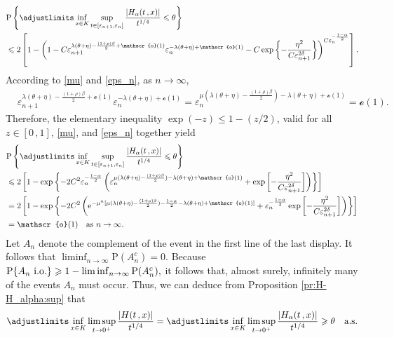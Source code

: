 \documentclass[reqno]{amsart}
\newcommand{\<}{\langle}
\renewcommand{\>}{\rangle}
\renewcommand{\P}{\mathrm{P}}
\newcommand{\1}{\mathbb{1}}
\newcommand{\e}{{\rm e}}
\renewcommand{\ge}{\geqslant}
\renewcommand{\le}{\leqslant}
\theoremstyle{definition}
\numberwithin{equation}{section}
\begin{document}
\begin{align*}
	&\P\left\{\adjustlimits
		\inf_{x \in K} \sup_{t \in [\varepsilon_{n+1},\varepsilon_n]}
		\frac{|H_\alpha(t\,,x)|}{t^{1/4}} \le \theta \right\}\\
	& \le 2 \left[ 1 - \left( 1 - C 
		\varepsilon_{n+1}^{\lambda(\theta+\eta)-\frac{(1+\rho)\beta}{2} 
		+ \mathscr{o}(1)} \varepsilon_n^{-\lambda(\theta+\eta) + \mathscr{o}(1)}
	- C\exp\left\{- \frac{\eta^2 }{C\varepsilon_{n+1}^{2\delta}}\right\}
		\right)^{C \varepsilon_n^{-\frac{1-\alpha}{2}}} \right].
\end{align*}
According to \eqref{mu} and \eqref{eps_n}, as $n\to\infty$,
\begin{align*}
	&\varepsilon_{n+1}^{\lambda(\theta+\eta)-\frac{(1+\rho)\beta}{2} 
		+ \mathscr{o}(1)} \varepsilon_n^{-\lambda(\theta+\eta) + \mathscr{o}(1)}
		= \varepsilon_n^{\mu(\lambda(\theta+\eta)-\frac{(1+\rho)\beta}{2})
		-\lambda(\theta+\eta) + \mathscr{o}(1)} = \mathscr{o}(1).
\end{align*}
Therefore, the elementary inequality $\exp(-z) \le 1-(z/2)$,
valid for all $z \in [0\,,1]$, \eqref{mu}, and \eqref{eps_n} together yield
\begin{align*}
	&\P\left\{ \adjustlimits
		\inf_{x \in K} \sup_{t \in [\varepsilon_{n+1},\varepsilon_n]}
		\frac{|H_\alpha(t\,,x)|}{t^{1/4}} \le \theta \right\}\\
	&\le2\left[ 1 - \exp\left\{ -2C^2 \varepsilon_n^{-\frac{1-\alpha}{2}}
		\left(\varepsilon_{n}^{\mu(\lambda(\theta+\eta)-
		\frac{(1+\rho)\beta}{2})-\lambda(\theta+\eta)
		+\mathscr{o}(1)} + \exp\left[-\frac{\eta^2}{C\varepsilon_{n+1}^{2\delta}}\right]
		\right)\right\} \right]\\
	&= 2\left[ 1 - \exp\left\{ -2C^2 \left(\e^{ - \mu^n 
		[ \mu ( \lambda(\theta+\eta) - \frac{(1+\rho)\beta}{2} ) -\frac{1-\alpha}{2} - 
		\lambda(\theta+\eta) + \mathscr{o}(1) ]} + 
		\varepsilon_n^{-\frac{1-\alpha}{2}} 
		\exp\left[-\frac{\eta^2}{C\varepsilon_{n+1}^{2\delta}}\right]
		\right)\right\} \right]\\
	&=\mathscr{o}(1) \quad \text{as $n\to\infty$.}
\end{align*}
Let $A_n$ denote the complement of the event in the first line of the last display.
It follows that $\liminf_{n\to\infty}\P(A_n^c)=0.$
Because $\P\{A_n\text{\ \rm i.o.}\} \ge 1-\liminf_{n\to\infty}\P(A_n^c),$
it follows that, almost surely, infinitely many of the events $A_n$ must occur. 
Thus, we can deduce from Proposition \ref{pr:H-H_alpha:sup} that
\begin{align}\label{E:inflim:LB}
	\adjustlimits\inf_{x\in K}\limsup_{t \to 0^+} \frac{|H(t\,,x)|}{t^{1/4}} 
	= \adjustlimits\inf_{x\in K}\limsup_{t \to 0^+} 
	\frac{|H_\alpha(t\,,x)|}{t^{1/4}} \ge \theta\quad\text{a.s.}
\end{align}
\end{document}
